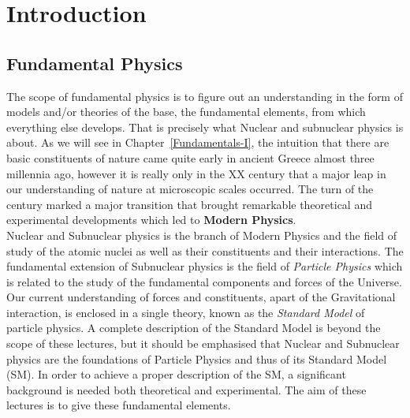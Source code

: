 %
%
%

\chapter{Introduction}
\label{chap:Introduction}


\section{Fundamental Physics}
\label{intro:intro}

The scope of fundamental physics is to figure out an understanding in the form of models and/or theories of the base, the fundamental elements, from which everything else develops. That is precisely what Nuclear and subnuclear physics is about. As we will see in Chapter~\ref{Fundamentals-I}, the intuition that there are basic constituents of nature came quite early in ancient Greece almost three millennia ago, however it is really only in the XX century that a major leap in our understanding of nature at microscopic scales occurred. The turn of the century marked a major transition that brought remarkable theoretical and experimental developments which led to {\bf Modern Physics}.\\

Nuclear and Subnuclear physics is the  branch of Modern Physics and the field of study of the atomic nuclei as well as their constituents and their interactions. The fundamental extension of Subnuclear physics is the field of \emph{Particle Physics} which is related to the study of the fundamental components and forces of the Universe. Our current understanding of forces and constituents, apart of the Gravitational interaction, is enclosed in a single theory, known as the \emph{Standard Model} of particle physics. A complete description of the Standard Model is beyond the scope of these lectures, but it should be emphasised that Nuclear and Subnuclear physics are the foundations of Particle Physics and thus of its Standard Model (SM). In order to achieve a proper description of the SM, a significant background is needed both theoretical and experimental. The aim of these lectures is to give these fundamental elements. \\

